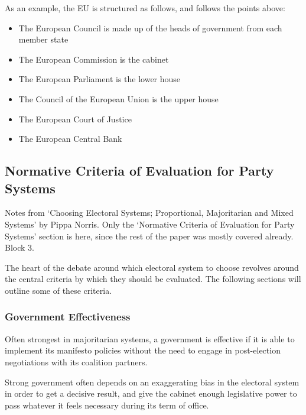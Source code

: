 As an example, the EU is structured as follows, and follows the points
above:

\begin{itemize}
  \item The European Council is made up of the heads of government from
    each member state
  \item The European Commission is the cabinet
  \item The European Parliament is the lower house
  \item The Council of the European Union is the upper house
  \item The European Court of Justice
  \item The European Central Bank
\end{itemize}

\subsection{Normative Criteria of Evaluation for Party Systems}
\begin{flushright}
  \scriptsize Notes from `Choosing Electoral Systems; Proportional,
  Majoritarian and Mixed Systems' by Pippa Norris. Only the `Normative
  Criteria of Evaluation for Party Systems' section is here, since the
  rest of the paper was mostly covered already. Block 3.
\end{flushright}

The heart of the debate around which electoral system to choose
revolves around the central criteria by which they should be
evaluated. The following sections will outline some of these criteria.


\subsubsection{Government Effectiveness}

Often strongest in majoritarian systems, a government is effective if
it is able to implement its manifesto policies without the need to
engage in post-election negotiations with its coalition partners.

Strong government often depends on an exaggerating bias in the
electoral system in order to get a decisive result, and give the
cabinet enough legislative power to pass whatever it feels necessary
during its term of office.

